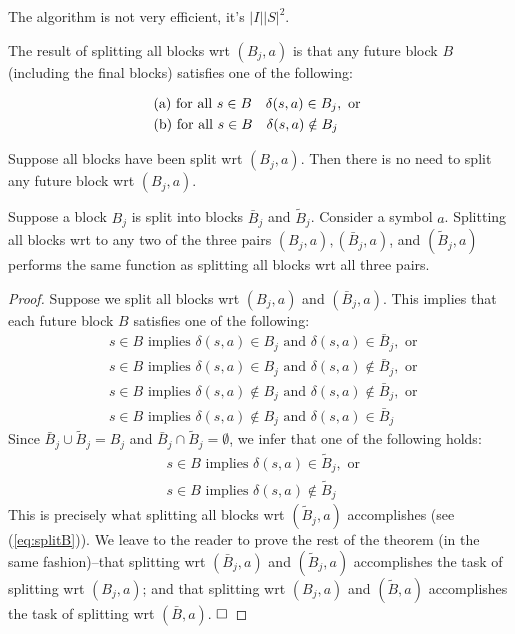 The algorithm is not very efficient, it's $|I||S|^2$.

The result of splitting all blocks wrt $(B_j, a)$ is that any future block $B$ (including the final blocks) satisfies one of the following:

\begin{align}
&\text{(a) for all } s\in B\quad \delta(s,a)\in B_j, \text{ or } \label{eq:splitB} \\
&\text{(b) for all } s\in B\quad \delta(s,a)\notin B_j \notag %
\end{align}

\begin{lemma} 
	Suppose all blocks have been split wrt $(B_j, a)$. Then there is no need to split any future block wrt $(B_j, a)$.
\end{lemma}

\begin{lemma} \label{lem:three_pairs}
Suppose a block $B_j$ is split into blocks $\bar{B}_j$ and $\tilde{B}_j$. Consider a symbol $a$. Splitting all blocks wrt to any two of the three pairs $(B_j, a), (\bar{B}_j, a)$, and $(\tilde{B}_j, a)$ performs the same function as splitting all blocks wrt all three pairs.
\end{lemma}

\begin{proof}
	Suppose we split all blocks wrt $(B_j, a)$ and $(\bar{B}_j, a)$. This implies that each future block $B$ satisfies one of the following:
	\begin{align*}
    & s\in B \text{ implies } \delta(s,a)\in B_j \text{ and } \delta(s,a)\in \bar{B}_j, \text{ or } \\
    & s\in B \text{ implies } \delta(s,a)\in B_j \text{ and } \delta(s,a)\notin \bar{B}_j, \text{ or } \\
    & s\in B \text{ implies } \delta(s,a)\notin B_j \text{ and } \delta(s,a)\notin \bar{B}_j, \text{ or } \\
    & s\in B \text{ implies } \delta(s,a)\notin B_j \text{ and } \delta(s,a)\in \bar{B}_j
	\end{align*}
	Since $\bar{B}_j\cup\tilde{B}_j=B_j$ and $\bar{B}_j\cap\tilde{B}_j=\emptyset$, we infer that one of the following holds:
	\begin{align*}
	& s\in B \text{ implies } \delta(s,a)\in \tilde{B}_j, \text{ or } \\
	& s\in B \text{ implies } \delta(s,a)\notin \tilde{B}_j
	\end{align*}
	This is precisely what splitting all blocks wrt $(\tilde{B}_j,a)$ accomplishes (see (\ref{eq:splitB})). We leave to the reader to prove the rest of the theorem (in the same fashion)--that	splitting wrt $(\bar{B}_j,a)$ and $(\tilde{B}_j,a)$ accomplishes the task of splitting wrt $(B_j, a)$; and that splitting wrt $(B_j, a)$ and $(\tilde{B}, a)$ accomplishes the task of splitting wrt  $(\bar{B}, a)$. $\hfill\square$
\end{proof}

